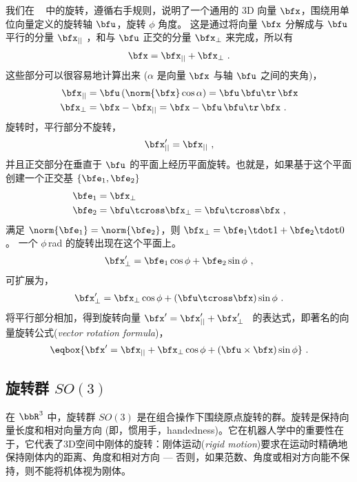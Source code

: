 我们在 ~ 中的旋转，遵循右手规则，说明了一个通用的 3D 向量 $\bfx$，围绕用单位向量定义的旋转轴 $\bfu$，旋转 $\phi$ 角度。 
这是通过将向量 $\bfx$ 分解成与 $\bfu$ 平行的分量 $\bfx_{||}$ ，和与 $\bfu$ 正交的分量 $\bfx_\bot$ 来完成，所以有
%
%
\begin{align*}
\bfx=\bfx_{||}+\bfx_\bot~. 
\end{align*}
%
这些部分可以很容易地计算出来 ($\alpha$ 是向量 $\bfx$ 与轴 $\bfu$ 之间的夹角)，
%
%
\begin{align*}
\bfx_{||} &= \bfu \, (\norm{\bfx}\cos\alpha)  = \bfu\,\bfu\tr\,\bfx 
\\
\bfx_\bot &= \bfx - \bfx_{||} = \bfx - \bfu\,\bfu\tr\,\bfx~.
\end{align*}%
%
旋转时，平行部分不旋转， 
%
\begin{align*}
\bfx_{||}' = \bfx_{||}~,
\end{align*}
%
并且正交部分在垂直于 $\bfu$ 的平面上经历平面旋转。也就是，如果基于这个平面创建一个正交基 $\{\bfe_1,\bfe_2\}$ 
%
%
\begin{align*}
\bfe_1 &= \bfx_\bot \\
\bfe_2 &= \bfu \tcross \bfx_\bot = \bfu \tcross \bfx  ~, 
\end{align*}%
%
满足 $\norm{\bfe_1} = \norm{\bfe_2}$，则 $\bfx_\bot=\bfe_1\tdot1+\bfe_2\tdot0$。 一个 $\phi$\,rad 的旋转出现在这个平面上。
%
\begin{align*}
\bfx_\bot' = \bfe_1\cos\phi + \bfe_2\sin\phi~,
\end{align*}
%
可扩展为，
%
\begin{align*}
\bfx_\bot' = \bfx_\bot\cos\phi + (\bfu\tcross\bfx)\sin\phi~.
\end{align*}
%
将平行部分相加，得到旋转向量 $\bfx'=
\bfx'_{||}+\bfx'_\bot$~ 的表达式，即著名的向量旋转公式(\emph{vector rotation formula})，
%
\begin{align}
\eqbox{
\bfx'=
\bfx_{||}+\bfx_\bot\cos\phi+(\bfu\times\bfx)\sin\phi}~.
\label{equ:vecRotFormula}
\end{align}
%


\subsection{旋转群 $SO(3)$}

在 $\bbR^3$ 中，旋转群 $SO(3)$ 是在组合操作下围绕原点旋转的群。旋转是保持向量长度和相对向量方向 (即，惯用手，handedness)。它在机器人学中的重要性在于，它代表了3D空间中刚体的旋转：刚体运动(\emph{rigid motion})要求在运动时精确地保持刚体内的距离、角度和相对方向 --- 否则，如果范数、角度或相对方向能不保持，则不能将机体视为刚体。

